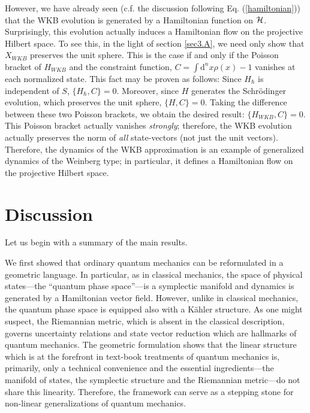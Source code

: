 \documentclass[12pt,aps,eqsecnum,tighten,nofootinbib]{revtex4-2}
\def\d{{\mathrm d}}
\def\H{{\cal H}}
\begin{document}
However, we have already seen (c.f. the discussion following
Eq. (\ref{hamiltonian})) that the WKB evolution is generated by a
Hamiltonian function on $\H$. Surprisingly, this evolution actually
induces a Hamiltonian flow on the projective Hilbert space.  To see
this, in the light of section \ref{sec3.A}, we need only show that
$X_{WKB}$ preserves the unit sphere.  This is the case if and only if
the Poisson bracket of $H_{WKB}$ and the constraint function, $C =
\int \d^n \!x \rho(x) -1$ vanishes at each normalized state. This fact
may be proven as follows: Since $H_{\hbar}$ is independent of $S$,
$\{H_\hbar, C \} = 0$.  Moreover, since $H$ generates the
Schr\"odinger evolution, which preserves the unit sphere, $\{H,
C\}=0$.  Taking the difference between these two Poisson brackets, we
obtain the desired result: $\{H_{WKB}, C\} = 0$.  This Poisson bracket
actually vanishes {\em strongly}; therefore, the WKB evolution
actually preserves the norm of {\em all} state-vectors (not just the
unit vectors).  Therefore, the dynamics of the WKB approximation is an
example of generalized dynamics of the Weinberg type; in particular,
it defines a Hamiltonian flow on the projective Hilbert space.


\section{Discussion}

Let us begin with a summary of the main results. 

We first showed that ordinary quantum mechanics can be reformulated in
a geometric language.  In particular, as in classical mechanics, the
space of physical states---the ``quantum phase space''---is a
symplectic manifold and dynamics is generated by a Hamiltonian vector
field. However, unlike in classical mechanics, the quantum phase space
is equipped also with a K\"ahler structure. As one might suspect, the
Riemannian metric, which is absent in the classical description,
governs uncertainty relations and state vector reduction which are
hallmarks of quantum mechanics. The geometric formulation shows that
the linear structure which is at the forefront in text-book treatments
of quantum mechanics is, primarily, only a technical convenience and
the essential ingredients---the manifold of states, the symplectic
structure and the Riemannian metric---do not share this
linearity. Therefore, the framework can serve as a stepping stone
for non-linear generalizations of quantum mechanics.
\end{document}
